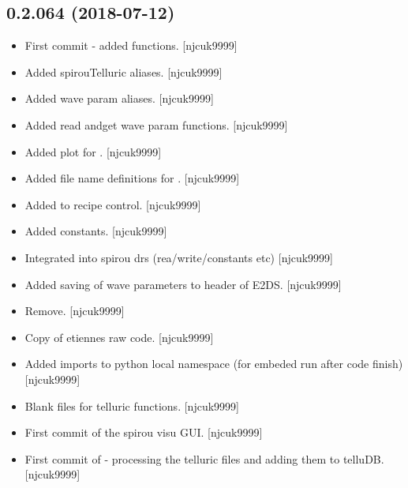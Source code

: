 \documentclass[a4paper,10pt,english]{report}
\begin{document}
\subsection{0.2.064 (2018-07-12)}
\label{\detokenize{misc/changelog:id396}}\begin{itemize}
\item {} 
First commit - added  functions. {[}njcuk9999{]}

\item {} 
Added spirouTelluric aliases. {[}njcuk9999{]}

\item {} 
Added wave param aliases. {[}njcuk9999{]}

\item {} 
Added read andget wave param functions. {[}njcuk9999{]}

\item {} 
Added plot for . {[}njcuk9999{]}

\item {} 
Added file name definitions for . {[}njcuk9999{]}

\item {} 
Added  to recipe control. {[}njcuk9999{]}

\item {} 
Added  constants. {[}njcuk9999{]}

\item {} 
Integrated  into spirou drs (rea/write/constants etc)
{[}njcuk9999{]}

\item {} 
Added saving of wave parameters to header of E2DS. {[}njcuk9999{]}

\item {} 
Remove. {[}njcuk9999{]}

\item {} 
Copy of etiennes raw  code. {[}njcuk9999{]}

\item {} 
Added imports to python local namespace (for embeded run after code
finish) {[}njcuk9999{]}

\item {} 
Blank files for telluric functions. {[}njcuk9999{]}

\item {} 
First commit of the spirou visu GUI. {[}njcuk9999{]}

\item {} 
First commit of  - processing the telluric files and
adding them to telluDB. {[}njcuk9999{]}

\end{itemize}
\end{document}

